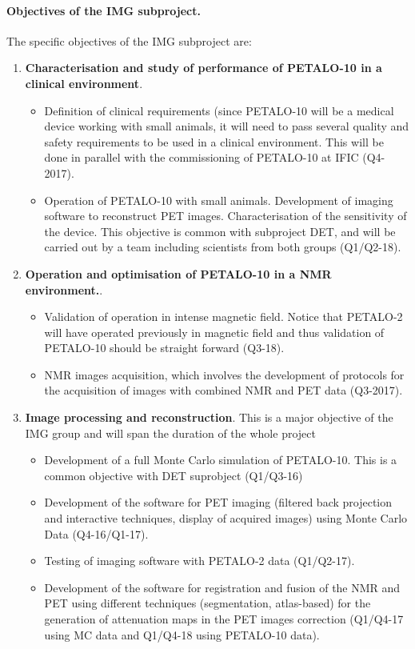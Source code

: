 \paragraph{Objectives of the IMG subproject.}
The specific objectives of the IMG subproject are:

\begin{enumerate}
\item {\bf Characterisation and study of performance of PETALO-10  in a clinical environment}. 
\begin{itemize}
\item Definition of clinical requirements (since PETALO-10 will be a medical device working with small animals, it will need to pass several quality and safety requirements to be used in a clinical environment. This will be done in parallel with the commissioning of PETALO-10 at IFIC (Q4-2017).
\item Operation of PETALO-10 with small animals. Development of imaging software to reconstruct PET images. Characterisation of the sensitivity of the device. This objective is common with subproject DET, and will be carried out by a team including scientists from both groups (Q1/Q2-18).
\end{itemize}
\item {\bf Operation and optimisation of  PETALO-10 in a NMR environment.}. 
\begin{itemize}
\item Validation of operation in intense magnetic field. Notice that PETALO-2 will have operated previously in magnetic field and thus validation of PETALO-10 should be straight forward (Q3-18).   
\item NMR images acquisition, which involves the development of protocols for the acquisition of images with combined NMR and PET data (Q3-2017).
\end{itemize} 
\item {\bf Image processing and reconstruction}. This is a major objective of the IMG group and will span the duration of the whole project
\begin{itemize}
\item Development of a full Monte Carlo simulation of PETALO-10. This is a common objective with DET suprobject (Q1/Q3-16)
\item Development of the software for PET imaging (filtered back projection and interactive techniques, display of acquired images) using Monte Carlo Data (Q4-16/Q1-17).
\item Testing of imaging software with PETALO-2 data (Q1/Q2-17).
\item Development of the software for registration and fusion of the NMR and PET using different techniques (segmentation, atlas-based) for the generation of attenuation maps in the PET images correction (Q1/Q4-17 using MC data and Q1/Q4-18 using PETALO-10 data).    
\end{itemize} 
\end{enumerate}
